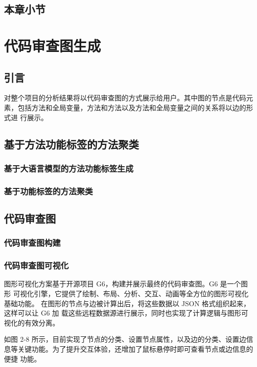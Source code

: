 \section{本章小节}



\chapter{代码审查图生成}
\section{引言}
对整个项目的分析结果将以代码审查图的方式展示给用户。其中图的节点是代码元
素，包括方法和全局变量，方法和方法以及方法和全局变量之间的关系将以边的形式进
行展示。

\section{基于方法功能标签的方法聚类}
\subsection{基于大语言模型的方法功能标签生成}
\subsection{基于功能标签的方法聚类}

\section{代码审查图}
\subsection{代码审查图构建}
\subsection{代码审查图可视化}

图形可视化方案基于开源项目 G6，构建并展示最终的代码审查图。G6 是一个图形
可视化引擎，它提供了绘制、布局、分析、交互、动画等全方位的图形可视化基础功能。
在图形的节点与边被计算出后，将这些数据以 JSON 格式组织起来，这样可以让 G6 加
载这些远程数据源进行展示，同时也实现了计算逻辑与图形可视化的有效分离。


如图 2-8 所示，目前实现了节点的分类、设置节点属性，以及边的分类、设置边信
息等关键功能。为了提升交互体验，还增加了鼠标悬停时即可查看节点或边信息的便捷
功能。

